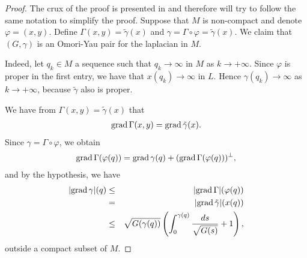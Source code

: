 \documentclass[a4paper]{amsart}
\begin{document}
\begin{proof} The crux of the proof is presented in \cite{alias-dajczer} and therefore will try to follow the same notation to simplify the proof.
Suppose that $ M $ is non-compact and denote $ \varphi = (x,y) $. Define $ \Gamma(x,y) = \tilde{\gamma}(x) $ and $ \gamma = \Gamma\circ \varphi = \tilde{\gamma}(x) $. We claim that $ (G,\gamma) $ is an Omori-Yau pair for the laplacian in $ M $.

Indeed, let $ q_k \in M $ a sequence such that $ q_k \rightarrow \infty $ in $ M $ as $ k \rightarrow +\infty $. Since $ \varphi $ is proper in the first entry, we have that $ x(q_k) \rightarrow \infty $ in $ L $. Hence $ \gamma(q_k) \rightarrow \infty $ as $ k \rightarrow +\infty $, because $ \tilde{\gamma} $ also is proper. 

We have from $ \Gamma(x,y) = \tilde{\gamma}(x) $ that
\begin{eqnarray}\label{gradGama}
{{{\rm{grad}\,}}} \Gamma(x,y) = {{{\rm{grad}\,}}} \tilde{\gamma}(x) .
\end{eqnarray}
Since $ \gamma = \Gamma\circ\varphi $, we obtain
\begin{eqnarray}
{{{\rm{grad}\,}}} \Gamma(\varphi(q)) = {{{\rm{grad}\,}}} \gamma(q) + ({{{\rm{grad}\,}}} \Gamma(\varphi(q)))^{\perp} ,
\end{eqnarray}
and by the hypothesis, we have
\begin{eqnarray*}
\vert {{{\rm{grad}\,}}} \gamma \vert(q) &\leq & \vert {{{\rm{grad}\,}}} \Gamma\vert (\varphi(q)) \nonumber \\
&=& \vert {{{\rm{grad}\,}}} \tilde{\gamma}\vert(x(q)) \nonumber \\
&\leq & \sqrt{G(\gamma(q))}\left(\int_{0}^{\gamma(q)}\frac{ds}{\sqrt{G(s)}} + 1\right) ,
\end{eqnarray*}
outside a compact subset of $ M $.


\end{proof}
\end{document}
